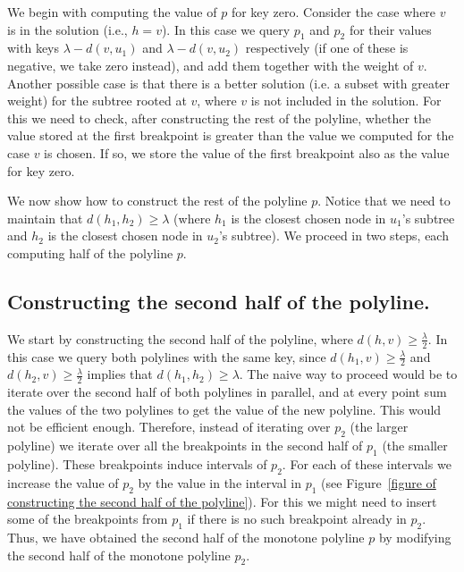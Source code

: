 \documentclass[a4paper,UKenglish]{lipics-v2016}
\theoremstyle{plain}
\begin{document}
We begin with computing the value of $p$ for key zero. Consider the case where $v$ is in the solution (i.e., $h=v$). In this case we query $p_1$ and $p_2$ for their values with keys $\lambda - d(v,u_1)$ and $\lambda - d(v,u_2)$ respectively (if one of these is negative, we take zero instead), and add them together with the weight of $v$. Another possible case is that there is a better solution (i.e. a subset with greater weight) for the subtree rooted at $v$, where $v$ is not included in the solution. For this we need to check, after constructing the rest of the polyline, whether the value stored at the first breakpoint is greater than the value we computed for the case $v$ is chosen. If so, we store the value of the first breakpoint also as the value for key zero.

We now show how to construct the rest of the polyline $p$. Notice that we need to maintain that $d(h_1,h_2) \geq \lambda$ (where $h_1$ is the closest chosen node in $u_1$'s subtree and $h_2$ is the closest chosen node in $u_2$'s subtree). We proceed in two steps, each computing half of the polyline $p$.

\subsection{Constructing the second half of the polyline.}\label{subsection constructing the second half of the polyline} We start by constructing the second half of the polyline, where $d(h,v) \geq \frac{\lambda}{2}$. In this case we query both polylines with the same key, since $d(h_1,v) \geq \frac{\lambda}{2}$ and $d(h_2,v) \geq \frac{\lambda}{2}$ implies that $d(h_1,h_2) \geq \lambda$. The naive way to proceed would be to iterate over the second half of both polylines in parallel, and at every point sum the values of the two polylines to get the value of the new polyline. This would not be efficient enough. Therefore, instead of iterating over $p_2$ (the larger polyline) we iterate over all the breakpoints in the second half of $p_1$ (the smaller polyline). These breakpoints induce intervals of $p_2$. For each of these intervals we increase the value of $p_{2}$ by the value in the interval in $p_1$ (see Figure~\ref{figure of constructing the second half of the polyline}). For this we might need to insert some of the breakpoints from $p_1$ if there is no such breakpoint already in $p_2$. Thus, we have obtained the second half of the monotone polyline $p$ by modifying the second half of the monotone polyline $p_{2}$.
\end{document}
